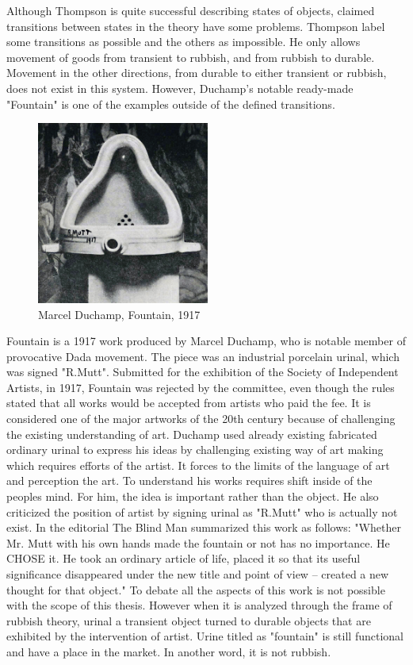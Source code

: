 Although Thompson is quite successful describing states of objects, claimed transitions between states in the theory have some problems. Thompson label some transitions as possible and the others as impossible. He only allows movement of goods from transient to rubbish, and from rubbish to durable. Movement in the other directions, from durable to either transient or rubbish, does not exist in this system. However, Duchamp's notable ready-made "Fountain" is one of the examples outside of the defined transitions.

\begin{figure}[h!]
  \centering
  \includegraphics[height=6cm]{graphics/Duchamp_Fountaine.jpg}
  \caption{Marcel Duchamp, Fountain, 1917}
  \label{fig:Duchamp_Fountaine}
\end{figure}

Fountain is a 1917 work produced by Marcel Duchamp, who is notable member of provocative Dada movement. The piece was an industrial porcelain urinal, which was signed "R.Mutt". Submitted for the exhibition of the Society of Independent Artists, in 1917, Fountain was rejected by the committee, even though the rules stated that all works would be accepted from artists who paid the fee. It is considered one of the major artworks of the 20th century because of challenging the existing understanding of art. Duchamp used already existing fabricated ordinary urinal to express his ideas by challenging existing way of art making which requires efforts of the artist. It forces to the limits of the language of art and perception the art. To understand his works requires shift inside of the peoples mind. For him, the idea is important rather than the object. He also criticized the position of artist by signing urinal as "R.Mutt" who is actually not exist. In the editorial The Blind Man summarized this work as follows: "Whether Mr. Mutt with his own hands made the fountain or not has no importance. He CHOSE it. He took an ordinary article of life, placed it so that its useful significance disappeared under the new title and point of view – created a new thought for that object." To debate all the aspects of this work is not possible with the scope of this thesis. However when it is analyzed through the frame of rubbish theory, urinal a transient object turned to durable objects that are exhibited by the intervention of artist. Urine titled as "fountain" is still functional and have a place in the market. In another word, it is not rubbish.

